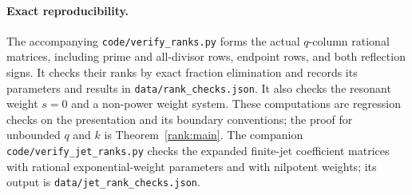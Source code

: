 \paragraph{Exact reproducibility.}
The accompanying \texttt{code/verify\_ranks.py} forms the actual
$q$-column rational matrices, including prime and all-divisor rows,
endpoint rows, and both reflection signs.  It checks their ranks by
exact fraction elimination and records its parameters and results in
\texttt{data/rank\_checks.json}.  It also checks the resonant weight
$s=0$ and a non-power weight system.  These computations are regression
checks on the presentation and its boundary conventions; the proof for
unbounded $q$ and $k$ is Theorem~\ref{rank:main}.
The companion \texttt{code/verify\_jet\_ranks.py} checks the expanded
finite-jet coefficient matrices with rational exponential-weight
parameters and with nilpotent weights; its output is
\texttt{data/jet\_rank\_checks.json}.
